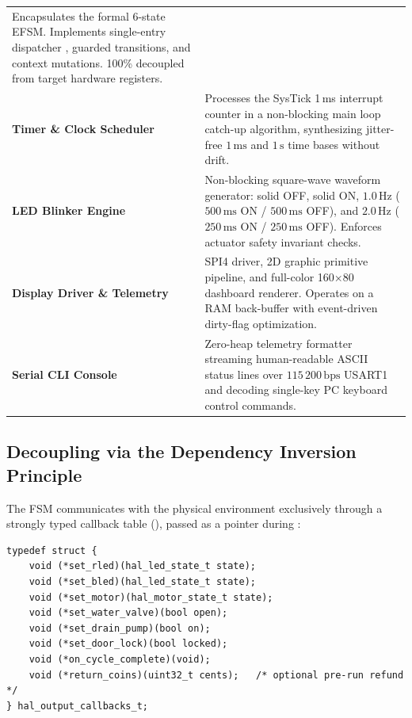 \begin{longtable}{L{4.8cm}L{10.8cm}}
    Encapsulates the formal 6-state EFSM. Implements single-entry dispatcher ,
    guarded transitions, and context mutations. 100\% decoupled from target hardware registers. \\
  \textbf{Timer \& Clock Scheduler}\newline{} &
    Processes the SysTick 1\,ms interrupt counter in a non-blocking main loop catch-up algorithm, synthesizing
    jitter-free $1\,\text{ms}$ and $1\,\text{s}$ time bases without drift. \\
  \textbf{LED Blinker Engine}\newline{} &
    Non-blocking square-wave waveform generator: solid OFF, solid ON, $1.0\,\text{Hz}$ ($500\,\text{ms}$ ON / $500\,\text{ms}$ OFF),
    and $2.0\,\text{Hz}$ ($250\,\text{ms}$ ON / $250\,\text{ms}$ OFF). Enforces actuator safety invariant checks. \\
  \textbf{Display Driver \& Telemetry}\newline{} &
    SPI4 driver, 2D graphic primitive pipeline, and full-color 160$\times$80 dashboard renderer. Operates on a
    RAM back-buffer with event-driven dirty-flag optimization. \\
  \textbf{Serial CLI Console}\newline{} &
    Zero-heap telemetry formatter streaming human-readable ASCII status lines over $115\,200\,\text{bps}$ USART1
    and decoding single-key PC keyboard control commands. \\
  \bottomrule
\end{longtable}

\subsection{Decoupling via the Dependency Inversion Principle}

The FSM communicates with the physical environment exclusively through a strongly typed callback table
(), passed as a pointer during :

\begin{lstlisting}[caption={Formal HAL output callback interface definition}]
typedef struct {
    void (*set_rled)(hal_led_state_t state);
    void (*set_bled)(hal_led_state_t state);
    void (*set_motor)(hal_motor_state_t state);
    void (*set_water_valve)(bool open);
    void (*set_drain_pump)(bool on);
    void (*set_door_lock)(bool locked);
    void (*on_cycle_complete)(void);
    void (*return_coins)(uint32_t cents);   /* optional pre-run refund */
} hal_output_callbacks_t;
\end{lstlisting}

